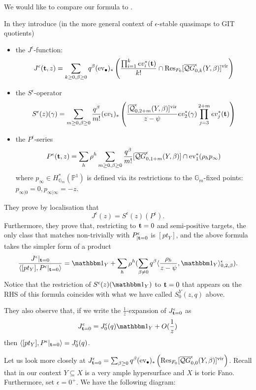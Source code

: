 \documentclass[11pt]{amsart}
\newcommand{\Qe}[4]{\overline{\mathcal Q}^{\epsilon}_{#1,#2}(#3,#4)}
\newcommand{\QGe}[4]{\overline{\mathcal QG}^{\epsilon}_{#1,#2}(#3,#4)}
\newcommand{\PP}{\mathbb P}
\newcommand{\Gm}{\mathbb{G}_m}
\newcommand{\ev}{\operatorname{ev}}
\theoremstyle{plain}
\theoremstyle{definition}
\begin{document}
We would like to compare our formula to \cite[Corollary 5.5.1]{CF-K-wallcrossing}.

In \cite[Section 5]{CF-K-wallcrossing} they introduce (in the more general context of $\epsilon$-stable quasimaps to GIT quotients)
\begin{itemize}
 \item the $J^{\epsilon}$-function:
 \[
  J^\epsilon({\bf t}, z)=\sum_{k\geq 0,\beta\geq 0}q^\beta(\ev_\bullet)_*\left(\frac{\prod_{i=1}^k ev_i^*({\bf t})}{k!}\cap\operatorname{Res}_{F_0}[\QGe{0}{k}{Y}{\beta}]^{\text{vir}}\right)
 \]
\item the $S^\epsilon$-operator
\[
 S^\epsilon(z)(\gamma)=\sum_{m\ge 0,\beta\ge 0}\frac{q^\beta}{m!} 
(ev_1)_*\left(\frac{[\Qe{0}{2+m}{Y}{\beta}]^{\text{vir}}}{z-\psi}ev_2^*(\gamma)\prod_{j=3}^{2+m}ev_j^*({\bf t})\right)
\]
\item the $P^\epsilon$-series
\[
 P^\epsilon({\bf t}, z)=\sum_h\rho^h\sum_{m\geq 0,\beta\geq 0} \frac{q^\beta }{m!}
[\QGe{0}{1+m}{Y}{\beta}]\cap \ev_1^*(\rho_h p_\infty)
\]
where $p_\infty\in H^*_{\Gm}(\PP^1)$ is defined via its restrictions to the $\Gm$-fixed points: $p_{\infty|0}=0,p_{\infty|\infty}=-z$.
\end{itemize}
They prove by localisation that \cite[Theorem 5.4.1]{CF-K-wallcrossing}
\[
 J^\epsilon(z)=S^\epsilon(z)(P^\epsilon).
\]
Furthermore, they prove that, restricting to ${\bf t}=0$ and semi-positive targets, the only class that matches non-trivially with $P^\epsilon_{|{\bf t}=0}$ is $[pt_Y]$, and the above formula takes the simpler form of a product \cite[Corollary 5.5.1]{CF-K-wallcrossing}
\[
 \frac{J^\epsilon |_{{\bf t}=0}}{\langle [pt_Y],  P^\epsilon|_{{\bf t}=0}\rangle}=\mathbbm 1_Y+\sum_h\rho^h(\sum_{\beta\neq 0}q^\beta\langle\frac{\rho_h}{z-\psi},\mathbbm 1_Y\rangle_{0,2,\beta}^\epsilon).
\]
Notice that the restriction of $S^\epsilon(z)(\mathbbm 1_Y)$ to ${\bf t}=0$ that appears on the RHS of this formula coincides with what we have called $S^Y_0(z,q)$ above.

They also observe that, if we write the $\frac{1}{z}$-expansion of $J^{\epsilon}_{{\bf t}=0}$ as
\[
 J^{\epsilon}_{{\bf t}=0}=J^{\epsilon}_{0}(q)\mathbbm 1_Y+O(\frac{1}{z})
\]
then $\langle [pt_Y],  P^\epsilon|_{{\bf t}=0}\rangle=J^{\epsilon}_{0}(q)$.

Let us look more closely at $J^{\epsilon}_{{\bf t}=0}=\sum_{\beta\geq 0}q^\beta(\ev_\bullet)_*\left(\operatorname{Res}_{F_0}[\QGe{0}{0}{Y}{\beta}]^{\text{vir}}\right)$. Recall that in our context $Y\subseteq X$ is a very ample hypersurface and $X$ is toric Fano. Furthermore, set $\epsilon=0^+$. We have the following diagram:
\end{document}
